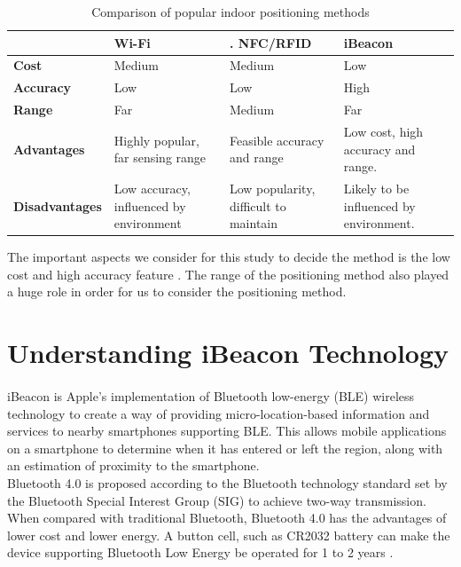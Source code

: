 \documentclass[12pt]{article}
\begin{document}
\begin{table}%
    \centering
   
    \label{my-label2}
       \begin{tabular}{|p{30mm}|p{30mm}|p{30mm}|p{30mm}|}
 \hline
  & \textbf{Wi-Fi }&.        \textbf{NFC/RFID} &  \textbf{iBeacon} \\ [0.5ex] 
 \hline\hline
 \textbf{Cost} & Medium & Medium & Low \\ 
 \hline
 \textbf{Accuracy} & Low & Low & High \\
 \hline
 \textbf{Range} & Far & Medium & Far \\
 \hline
 \textbf{Advantages} & Highly popular, far sensing range & Feasible accuracy and range & Low cost, high accuracy and range. \\
 \hline
 \textbf{Disadvantages} & Low accuracy, influenced by environment & Low popularity, difficult to maintain & Likely to be influenced by environment. \\ [1ex] 
 \hline
    \end{tabular}
     \caption{Comparison of popular indoor positioning methods} {The important aspects we consider for this study to decide the method is the low cost and high accuracy feature \cite{sensing}. The range of the positioning method also played a huge role in order for us to consider the positioning method.}
\end{table}

\section{Understanding iBeacon Technology}
\label{iBeacon-tech}
\paragraph{}iBeacon is Apple’s implementation of Bluetooth low-energy (BLE) wireless technology to create a way of providing micro-location-based information and services to nearby smartphones supporting BLE. This allows mobile applications on a smartphone to determine when it has entered or left the region, along with an estimation of proximity to the smartphone. \\

Bluetooth 4.0 is proposed according to the Bluetooth technology standard set by the Bluetooth Special Interest Group (SIG) to achieve two-way transmission. When compared with traditional Bluetooth, Bluetooth 4.0 has the advantages of lower cost and lower energy. A button cell, such as CR2032 battery can make the device supporting Bluetooth Low Energy be operated for 1 to 2 years \cite{taiwan}. \\
\end{document}
